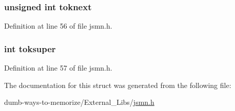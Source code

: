 \subsubsection[{\texorpdfstring{toknext}{toknext}}]{\setlength{\rightskip}{0pt plus 5cm}unsigned int toknext}\hypertarget{structjsmn__parser_a07a43834d3e063cab9e9a69b37dc55b8}{}\label{structjsmn__parser_a07a43834d3e063cab9e9a69b37dc55b8}


Definition at line 56 of file jsmn.\+h.

\subsubsection[{\texorpdfstring{toksuper}{toksuper}}]{\setlength{\rightskip}{0pt plus 5cm}int toksuper}\hypertarget{structjsmn__parser_a81bf640a522fb6791889aac12f71f8db}{}\label{structjsmn__parser_a81bf640a522fb6791889aac12f71f8db}


Definition at line 57 of file jsmn.\+h.



The documentation for this struct was generated from the following file\+:\begin{DoxyCompactItemize}
\item 
dumb-\/ways-\/to-\/memorize/\+External\+\_\+\+Libs/\hyperlink{jsmn_8h}{jsmn.\+h}\end{DoxyCompactItemize}
